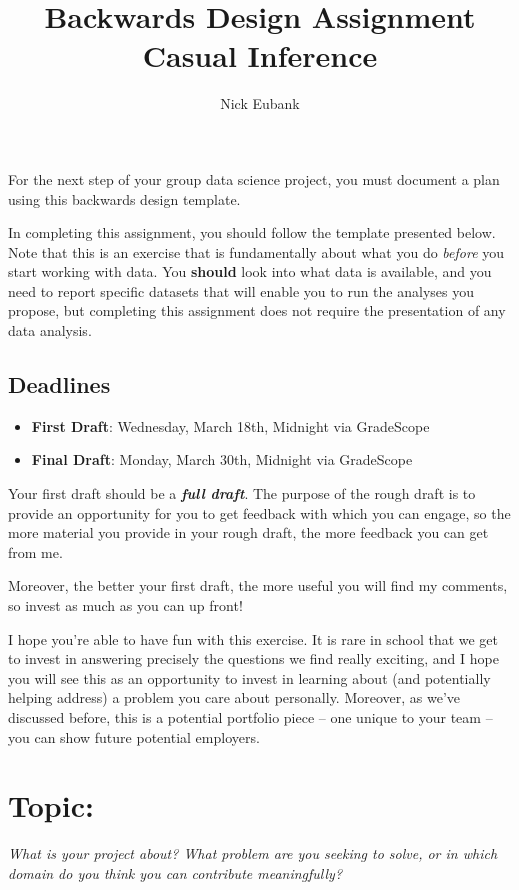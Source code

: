 \documentclass[12pt]{article}
\title{Backwards Design Assignment \\ Casual Inference}
\author{Nick Eubank}
\begin{document}
\maketitle

For the next step of your group data science project, you must document a plan using this backwards design template.

In completing this assignment, you should follow the template presented below. Note that this is an exercise that is fundamentally about what you do \emph{before} you start working with data. You \textbf{should} look into what data is available, and you need to report specific datasets that will enable you to run the analyses you propose, but completing this assignment does not require the presentation of any data analysis.

\subsection*{Deadlines}

\begin{itemize}
  \item \textbf{First Draft}: Wednesday, March 18th, Midnight via GradeScope
  \item \textbf{Final Draft}: Monday, March 30th, Midnight via GradeScope
\end{itemize}

Your first draft should be a \textbf{\emph{full draft}}. The purpose of the rough draft is to provide an opportunity for you to get feedback with which you can engage, so the more material you provide in your rough draft, the more feedback you can get from me.

Moreover, the better your first draft, the more useful you will find my comments, so invest as much as you can up front!

I hope you're able to have fun with this exercise. It is rare in school that we get to invest in answering precisely the questions we find really exciting, and I hope you will see this as an opportunity to invest in learning about (and potentially helping address) a problem you care about personally. Moreover, as we've discussed before, this is a potential portfolio piece -- one unique to your team -- you can show future potential employers.

\section{Topic:}
\emph{What is your project about? What problem are you seeking to solve, or in which domain do you think you can contribute meaningfully?}
\vspace*{1cm}\\
\end{document}
